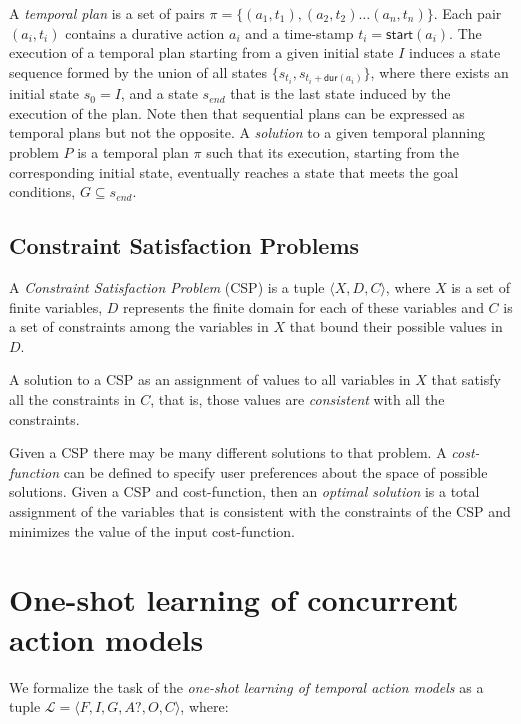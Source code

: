 \documentclass{ecai}
\newcommand{\tup}[1]{{\langle #1 \rangle}}
\newcommand{\dur}{\mathsf{dur}}    %
\newcommand{\start}{\mathsf{start}}%
\begin{document}
A {\em temporal plan} is a set of pairs $\pi=\{(a_1,t_1),(a_2,t_2)\ldots (a_n,t_n)\}$. Each pair $(a_i,t_i)$ contains a durative action $a_i$ and a time-stamp $t_i=\start(a_i)$. The execution of a temporal plan starting from a given initial state $I$ induces a state sequence formed by the union of all states $\{s_{t_i}, s_{t_i+\dur(a_i)}\}$, where there exists an initial state $s_{0}=I$, and a state $s_{end}$ that is the last state induced by the execution of the plan. Note then that sequential plans can be expressed as temporal plans but not the opposite. A {\em solution} to a given temporal planning problem $P$ is a temporal plan $\pi$ such that its execution, starting from the corresponding initial state, eventually reaches a state that meets the goal conditions, $G\subseteq s_{end}$.

\subsection{Constraint Satisfaction Problems}
A {\em Constraint Satisfaction Problem} (CSP) is a tuple $\tup{X,D,C}$, where $X$ is a set of finite variables, $D$ represents the finite domain for each of these variables and $C$ is a set of constraints among the variables in $X$ that bound their possible values in $D$.

A solution to a CSP as an assignment of values to all variables in $X$ that satisfy all the constraints in $C$, that is, those values are {\em consistent} with all the constraints.

Given a CSP there may be many different solutions to that problem. A {\em cost-function} can be defined to specify user preferences about the space of possible solutions. Given a CSP and cost-function, then an {\em optimal solution} is a total assignment of the variables that is consistent with the constraints of the CSP and minimizes the value of the input cost-function.



\section{One-shot learning of concurrent action models}
\label{section:learningTemporalModels}
We formalize the task of the {\em one-shot learning of temporal action models} as a tuple $\mathcal{L}=\tup{F,I,G,A?,O,C}$, where:
\end{document}
